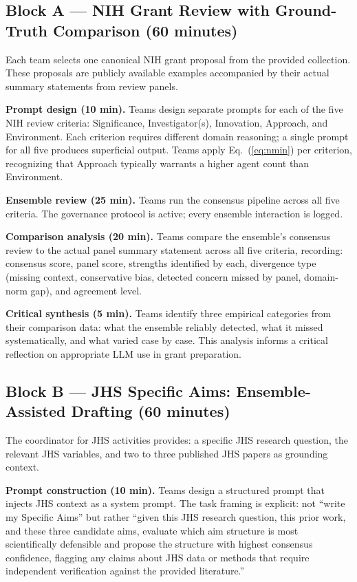 \subsection*{Block A --- NIH Grant Review with Ground-Truth
Comparison (60 minutes)}

Each team selects one canonical NIH grant proposal from the
provided collection. These proposals are publicly available
examples accompanied by their actual summary statements from
review panels.

\textbf{Prompt design (10 min).} Teams design separate prompts
for each of the five NIH review criteria: Significance,
Investigator(s), Innovation, Approach, and Environment. Each
criterion requires different domain reasoning; a single prompt
for all five produces superficial output. Teams apply
Eq.~(\ref{eq:nmin}) per criterion, recognizing that Approach
typically warrants a higher agent count than Environment.

\textbf{Ensemble review (25 min).} Teams run the consensus
pipeline across all five criteria. The governance protocol is
active; every ensemble interaction is logged.

\textbf{Comparison analysis (20 min).} Teams compare the
ensemble's consensus review to the actual panel summary
statement across all five criteria, recording: consensus score,
panel score, strengths identified by each, divergence type
(missing context, conservative bias, detected concern missed
by panel, domain-norm gap), and agreement level.

\textbf{Critical synthesis (5 min).} Teams identify three
empirical categories from their comparison data: what the
ensemble reliably detected, what it missed systematically, and
what varied case by case. This analysis informs a critical
reflection on appropriate LLM use in grant preparation.

\subsection*{Block B --- JHS Specific Aims: Ensemble-Assisted
Drafting (60 minutes)}

The coordinator for JHS activities provides: a specific JHS
research question, the relevant JHS variables, and two to three
published JHS papers as grounding context.

\textbf{Prompt construction (10 min).} Teams design a structured
prompt that injects JHS context as a system prompt. The task
framing is explicit: not ``write my Specific Aims'' but rather
``given this JHS research question, this prior work, and these
three candidate aims, evaluate which aim structure is most
scientifically defensible and propose the structure with highest
consensus confidence, flagging any claims about JHS data or
methods that require independent verification against the
provided literature.''

